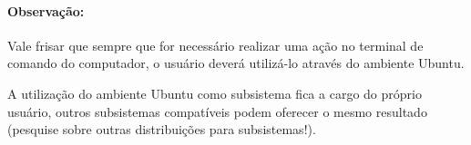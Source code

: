 \documentclass[12pt, a4paper]{article}
\newcommand{\red}{\textcolor{red}}
\begin{document}
\paragraph{Observação:} Vale frisar que sempre que for necessário realizar uma ação no terminal de comando do computador, o usuário deverá utilizá-lo através do ambiente Ubuntu.

A utilização do ambiente Ubuntu como subsistema fica a cargo do próprio usuário, outros subsistemas compatíveis podem oferecer o mesmo resultado (pesquise sobre outras distribuições para subsistemas!).


\newpage


\end{document}
